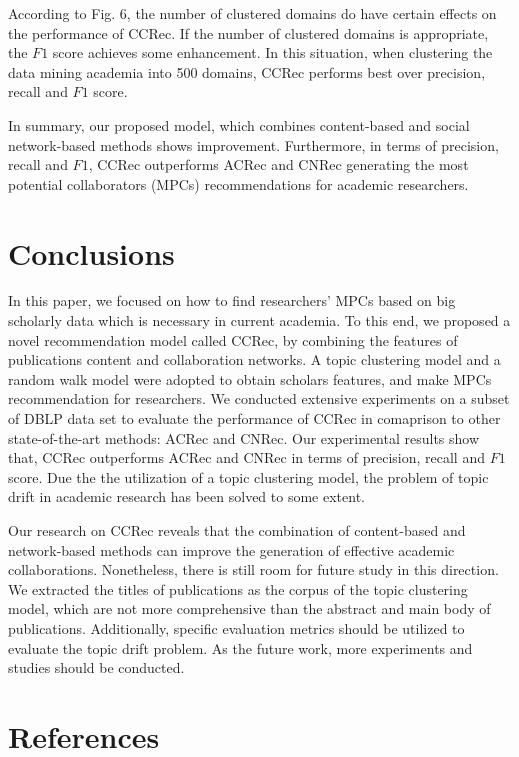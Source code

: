 \documentclass[review]{elsarticle}
\begin{document}
According to Fig. 6, the number of clustered domains do have certain effects on the performance of CCRec. If the number of clustered domains is appropriate, the $F1$ score achieves some enhancement. In this situation, when clustering the data mining academia into 500 domains, CCRec performs best over precision, recall and $F1$ score.

In summary, our proposed model, which combines content-based and social network-based methods shows improvement. Furthermore, in terms of precision, recall and $F1$, CCRec outperforms ACRec and CNRec generating the most potential collaborators (MPCs) recommendations for academic researchers.
\section{Conclusions}
In this paper, we focused on how to find researchers' MPCs based on big scholarly data which is necessary in current academia. To this end, we proposed a novel recommendation model called CCRec, by combining the features of publications content and collaboration networks. A topic clustering model and a random walk model were adopted to obtain scholars features, and make MPCs recommendation for researchers. We conducted extensive experiments on a subset of DBLP data set to evaluate the performance of CCRec in comaprison to other state-of-the-art methods: ACRec and CNRec. Our experimental results show that, CCRec outperforms ACRec and CNRec in terms of precision, recall and $F1$ score. Due the the utilization of a topic clustering model, the problem of topic drift in academic research has been solved to some extent.

Our research on CCRec reveals that the combination of content-based and network-based methods can improve the generation of effective academic collaborations. Nonetheless, there is still room for future study in this direction. We extracted the titles of publications as the corpus of the topic clustering model, which are not more comprehensive than the abstract and main body of publications. Additionally, specific evaluation metrics should be utilized to evaluate the topic drift problem. As the future work, more experiments and studies should be conducted.

\section*{References}


\end{document}
